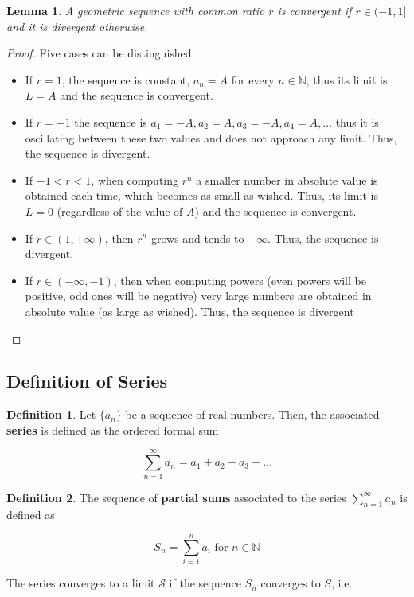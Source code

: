 \documentclass[a4paper,11pt]{article}
\theoremstyle{definition}
\newtheorem{definition}{Definition}
\theoremstyle{plain}
\newtheorem{lemma}{Lemma}
\begin{document}
\begin{lemma}
A geometric sequence with common ratio $r$ is convergent if $r\in (-1,1]$ and it is divergent otherwise.
\end{lemma}

\begin{proof}
Five cases can be distinguished:
\begin{itemize}
	\item If $r = 1$, the sequence is constant, $a_n = A$ for every $n\in\mathbb{N}$, thus its limit is $L = A$ and the sequence is convergent.
	\item If $r = -1$ the sequence is $a_1 = -A, a_2 = A, a_3 = -A, a_4 = A, \ldots$ thus it is oscillating between these two values and does not approach any limit. Thus, the sequence is divergent.
	\item If $-1 < r < 1$, when computing $r^n$ a smaller number in absolute value is obtained each time, which becomes as small as wished. Thus, its limit is $L = 0$ (regardless of the value of $A$) and the sequence is convergent.
	\item If $r\in (1,+\infty)$, then $r^n$ grows and tends to $+\infty$. Thus, the sequence is divergent.
	\item If $r\in(-\infty, -1)$, then when computing powers (even powers will be positive, odd ones will be negative) very large numbers are obtained in absolute value (as large as wished). Thus, the sequence is divergent
\end{itemize}
\end{proof}

\subsection{Definition of Series}

\begin{definition}
Let \(\{a_n\}\) be a sequence of real numbers. Then, the associated \textbf{series} is defined as the ordered formal
sum

\[
\sum^{\infty}_{n=1} a_n = a_1 + a_2 + a_3 + \ldots
\]
\end{definition}

\begin{definition}
The sequence of \textbf{partial sums} associated to the series \(\sum^{\infty}_{n=1}a_n\) is defined as

\[
S_n = \sum^n_{i=1} a_i \text{ for } n\in\mathbb{N}
\]
\end{definition}
The series converges 
to a limit \(\mathcal{S}\) if the sequence \(S_n\) converges to \(S\), i.e.
\end{document}
